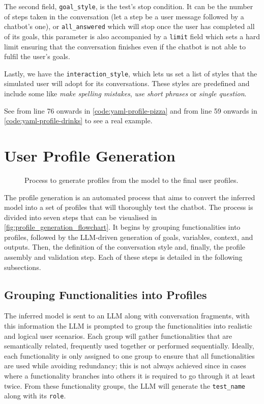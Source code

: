 The second field, \texttt{goal\_style}, is the test's stop condition.
It can be the number of steps taken in the conversation
(let a step be a user message followed by a chatbot's one),
or \texttt{all\_answered} which will stop once the user has completed all of its goals,
this parameter is also accompanied by a \texttt{limit} field which sets a hard limit
ensuring that the conversation finishes even if the chatbot is not able to fulfil the user's goals.

Lastly, we have the \texttt{interaction\_style},
which lets us set a list of styles that the simulated user will adopt for its conversations.
These styles are predefined and include some like
\textit{make spelling mistakes}, \textit{use short phrases}
or \textit{single question}.

See from line 76 onwards in \autoref{code:yaml-profile-pizza}
and from line 59 onwards in \autoref{code:yaml-profile-drinks}
to see a real example.

\section{User Profile Generation}\label{sec:profile-generation}

\begin{figure}[htpb]
    \centering
    
    \caption{Process to generate profiles from the model to the final user profiles.}
    \label{fig:profile_generation_flowchart}
\end{figure}

The profile generation is an automated process
that aims to convert the inferred model
into a set of profiles that will thoroughly test the chatbot.
The process is divided into seven steps that can be visualised in \autoref{fig:profile_generation_flowchart}.
It begins by
grouping functionalities into profiles,
followed by the \ac{LLM}-driven generation of goals, variables, context, and outputs.
Then, the definition of the conversation style and,
finally, the profile assembly and validation step.
Each of these steps is detailed in the following subsections.

\subsection{Grouping Functionalities into Profiles}

The inferred model is sent to an \ac{LLM} along with conversation fragments,
with this information the \ac{LLM} is prompted to
group the functionalities into realistic and logical user scenarios.
Each group will gather functionalities that are semantically related,
frequently used together or performed sequentially.
Ideally, each functionality is only assigned to one group
to ensure that all functionalities are used while avoiding redundancy;
this is not always achieved since in cases where a functionality branches into others
it is required to go through it at least twice.
From these functionality groups, the \ac{LLM} will generate
the \texttt{test\_name} along with its \texttt{role}.

